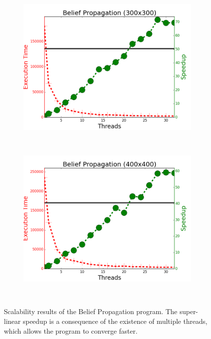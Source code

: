 \begin{figure}[]
        \centering
        \begin{subfigure}[b]{\plotsize\textwidth}
                \includegraphics[width=\textwidth]{experiments/scalability/scale-belief-propagation-300.png}
                \label{fig:implementation:scale_bp300}
        \end{subfigure}
        ~
        \begin{subfigure}[b]{\plotsize\textwidth}
                \includegraphics[width=\textwidth]{experiments/scalability/scale-belief-propagation-400.png}
                \label{fig:implementation:scale_bp400}
        \end{subfigure}\\
        \caption{Scalability results of the Belief Propagation program. The
        super-linear speedup is a consequence of the existence of multiple
        threads, which allows the program to converge faster.}
        \label{fig:implementation:scale_bp}
\end{figure}

